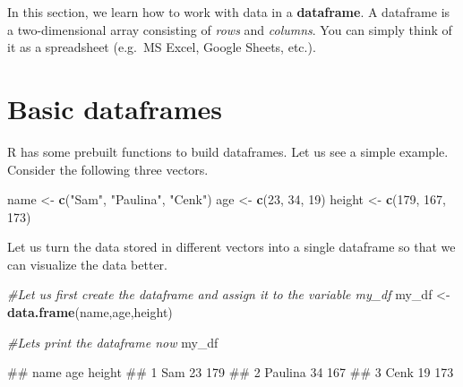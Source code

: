 \documentclass[
]{book}
\newenvironment{Shaded}{\begin{snugshade}}{\end{snugshade}}
\newcommand{\CommentTok}[1]{\textcolor[rgb]{0.56,0.35,0.01}{\textit{#1}}}
\newcommand{\DecValTok}[1]{\textcolor[rgb]{0.00,0.00,0.81}{#1}}
\newcommand{\FunctionTok}[1]{\textcolor[rgb]{0.13,0.29,0.53}{\textbf{#1}}}
\newcommand{\NormalTok}[1]{#1}
\newcommand{\OtherTok}[1]{\textcolor[rgb]{0.56,0.35,0.01}{#1}}
\newcommand{\StringTok}[1]{\textcolor[rgb]{0.31,0.60,0.02}{#1}}
\begin{document}
In this section, we learn how to work with data in a \textbf{dataframe}. A dataframe is a two-dimensional array consisting of \emph{rows} and \emph{columns}. You can simply think of it as a spreadsheet (e.g.~MS Excel, Google Sheets, etc.).

\hypertarget{basic-dataframes}{%
\section{Basic dataframes}\label{basic-dataframes}}

R has some prebuilt functions to build dataframes. Let us see a simple example. Consider the following three vectors.

\begin{Shaded}
\begin{Highlighting}[]
\NormalTok{name }\OtherTok{\textless{}{-}} \FunctionTok{c}\NormalTok{(}\StringTok{"Sam"}\NormalTok{, }\StringTok{"Paulina"}\NormalTok{, }\StringTok{"Cenk"}\NormalTok{)}
\NormalTok{age }\OtherTok{\textless{}{-}} \FunctionTok{c}\NormalTok{(}\DecValTok{23}\NormalTok{, }\DecValTok{34}\NormalTok{, }\DecValTok{19}\NormalTok{)}
\NormalTok{height }\OtherTok{\textless{}{-}} \FunctionTok{c}\NormalTok{(}\DecValTok{179}\NormalTok{, }\DecValTok{167}\NormalTok{, }\DecValTok{173}\NormalTok{)}
\end{Highlighting}
\end{Shaded}

Let us turn the data stored in different vectors into a single dataframe so that we can visualize the data better.

\begin{Shaded}
\begin{Highlighting}[]
\CommentTok{\#Let us first create the dataframe and assign it to the variable my\_df}
\NormalTok{my\_df }\OtherTok{\textless{}{-}} \FunctionTok{data.frame}\NormalTok{(name,age,height)}

\CommentTok{\#Let\textquotesingle{}s print the dataframe now}
\NormalTok{my\_df}
\end{Highlighting}
\end{Shaded}

\begin{Shaded}
\begin{Highlighting}[]
\NormalTok{\#\#      name age height}
\NormalTok{\#\# 1     Sam  23    179}
\NormalTok{\#\# 2 Paulina  34    167}
\NormalTok{\#\# 3    Cenk  19    173}
\end{Highlighting}
\end{Shaded}
\end{document}
